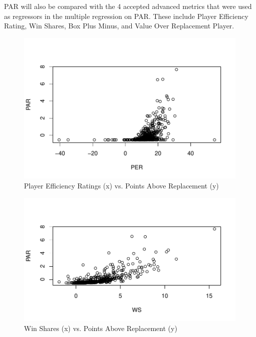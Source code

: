 \documentclass[12pt]{article}
\begin{document}
PAR will also be compared with the 4 accepted advanced metrics that 
were used as regressors in the 
multiple regression on PAR. These include Player Efficiency Rating, Win 
Shares, Box Plus Minus, and 
Value Over Replacement Player.

\begin{figure}[H]
  \centering
  \includegraphics[width=\textwidth]{PERvsPAR}
  \caption{Player Efficiency Ratings (x) vs. Points Above Replacement (y)}
  \label{fig:Fig1}
\end{figure}

\begin{figure}[H]
  \centering
  \includegraphics[width=\textwidth]{WSvsPAR}
  \caption{Win Shares (x) vs. Points Above Replacement (y)}
  \label{fig:Fig2}
\end{figure}
\end{document}

